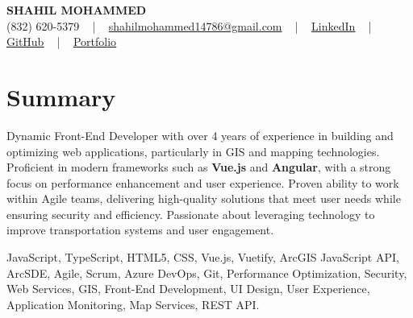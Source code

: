 \documentclass[letterpaper,10pt]{article}
\begin{document}
\begin{center}
    {\fontsize{14pt}{12pt}\selectfont \textbf{\MakeUppercase{Shahil Mohammed}}}\\ \vspace{2pt}
    \fontsize{10pt}{12pt}\selectfont (832) 620-5379 ~ | ~ \href{mailto:shahilmohammed14786@gmail.com}{shahilmohammed14786@gmail.com} ~ | ~  
    \href{https://www.linkedin.com/in/shahil-mohammed-9652931a1/}{\color{blue}\underline{LinkedIn}}  ~ | ~ 
    \href{https://github.com/freakbeast14}{\color{blue}\underline{GitHub}} ~ | ~ 
    \href{https://shahil-mohammed.netlify.app/}{\color{blue}\underline{Portfolio}}
    \vspace{-8pt}
\end{center}

\section{Summary}
\vspace{-2pt}\fontsize{8pt}{9pt}\selectfont
Dynamic Front-End Developer with over 4 years of experience in building and optimizing web applications, particularly in GIS and mapping technologies. Proficient in modern frameworks such as \textbf{Vue.js} and \textbf{Angular}, with a strong focus on performance enhancement and user experience. Proven ability to work within Agile teams, delivering high-quality solutions that meet user needs while ensuring security and efficiency. Passionate about leveraging technology to improve transportation systems and user engagement.
 \vspace{-5pt}
 
{\fontsize{1pt}{1pt}\selectfont\color{white}
JavaScript, TypeScript, HTML5, CSS, Vue.js, Vuetify, ArcGIS JavaScript API, ArcSDE, Agile, Scrum, Azure DevOps, Git, Performance Optimization, Security, Web Services, GIS, Front-End Development, UI Design, User Experience, Application Monitoring, Map Services, REST API.
}
\vspace{-8pt}

\vspace{-2pt}
\end{document}
